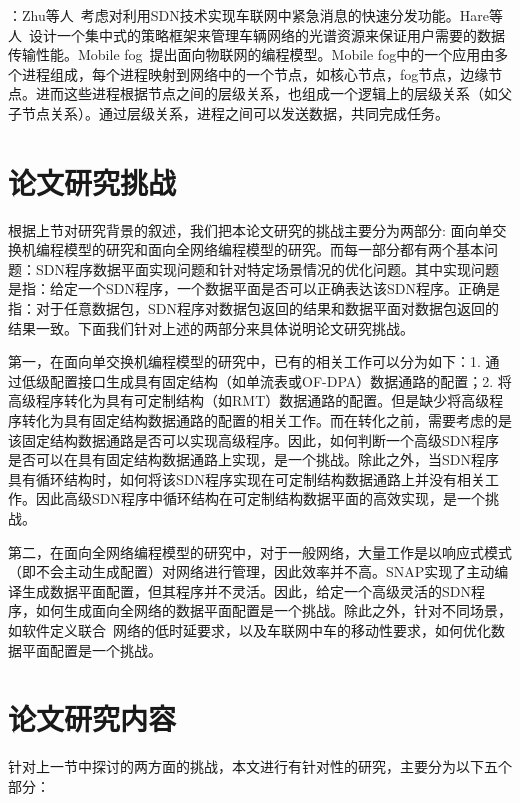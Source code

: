 ：Zhu等人~\cite{zhu2018sdn}考虑对利用SDN技术实现车联网中紧急消息的快速分发功能。Hare等人~\cite{hare2012policy}设计一个集中式的策略框架来管理车辆网络的光谱资源来保证用户需要的数据传输性能。Mobile fog~\cite{hong2013mobile}提出面向物联网的编程模型。Mobile fog中的一个应用由多个进程组成，每个进程映射到网络中的一个节点，如核心节点，fog节点，边缘节点。进而这些进程根据节点之间的层级关系，也组成一个逻辑上的层级关系（如父子节点关系）。通过层级关系，进程之间可以发送数据，共同完成任务。


\section{论文研究挑战}

根据上节对研究背景的叙述，我们把本论文研究的挑战主要分为两部分: 面向单交换机编程模型的研究和面向全网络编程模型的研究。而每一部分都有两个基本问题：SDN程序数据平面实现问题和针对特定场景情况的优化问题。其中实现问题是指：给定一个SDN程序，一个数据平面是否可以正确表达该SDN程序。正确是指：对于任意数据包，SDN程序对数据包返回的结果和数据平面对数据包返回的结果一致。下面我们针对上述的两部分来具体说明论文研究挑战。

第一，在面向单交换机编程模型的研究中，已有的相关工作可以分为如下：1. 通过低级配置接口生成具有固定结构（如单流表或OF-DPA）数据通路的配置；2. 将高级程序转化为具有可定制结构（如RMT）数据通路的配置。但是缺少将高级程序转化为具有固定结构数据通路的配置的相关工作。而在转化之前，需要考虑的是该固定结构数据通路是否可以实现高级程序。因此，如何判断一个高级SDN程序是否可以在具有固定结构数据通路上实现，是一个挑战。除此之外，当SDN程序具有循环结构时，如何将该SDN程序实现在可定制结构数据通路上并没有相关工作。因此高级SDN程序中循环结构在可定制结构数据平面的高效实现，是一个挑战。

第二，在面向全网络编程模型的研究中，对于一般网络，大量工作是以响应式模式（即不会主动生成配置）对网络进行管理，因此效率并不高。SNAP实现了主动编译生成数据平面配置，但其程序并不灵活。因此，给定一个高级灵活的SDN程序，如何生成面向全网络的数据平面配置是一个挑战。除此之外，针对不同场景，如软件定义联合~\cite{mishra2017comparing}网络的低时延要求，以及车联网中车的移动性要求，如何优化数据平面配置是一个挑战。

\section{论文研究内容}

针对上一节中探讨的两方面的挑战，本文进行有针对性的研究，主要分为以下五个部分：


